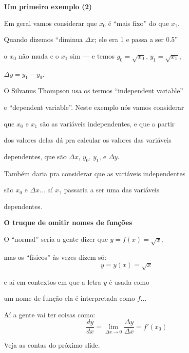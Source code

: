 \documentclass[oneside,12pt]{article}
\begin{document}
\newpage

{\bf Um primeiro exemplo (2)}

Em geral vamos considerar que $x_0$ é ``mais fixo'' do que $x_1$.

Quando dizemos ``diminua $Δx$; ele era 1 e passa a ser 0.5''

o $x_0$ não muda e o $x_1$ sim --- e temos $y_0 = \sqrt{x_0}$, $y_1 = \sqrt{x_1}$,

$Δy = y_1-y_0$.

\msk

O Silvanus Thompson usa os termos ``independent variable''

e ``dependent variable''. Neste exemplo nós vamos considerar

que $x_0$ e $x_1$ são as variáveis independentes, e que a partir

dos valores delas dá pra calcular os valores das variáveis

dependentes, que são $Δx$, $y_0$, $y_1$, e $Δy$.


\msk

Também daria pra considerar que as variáveis independentes

são $x_0$ e $Δx$... aí $x_1$ passaria a ser uma das variáveis

dependentes.


\newpage


{\bf O truque de omitir nomes de funções}

\ssk

O ``normal'' seria a gente dizer que $y = f(x) = \sqrt{x}$,

mas os ``físicos'' às vezes dizem só:
%
$$y = y(x) = \sqrt{x}$$

e aí em contextos em que a letra $y$ é usada como

um nome de função ela é interpretada como $f$...

Aí a gente vai ter coisas como:
%
\def\limdx{\lim_{Δx→0}}
%
$$\frac{dy}{dx} = \limdx \frac{Δy}{Δx} = f'(x_0)$$

Veja as contas do próximo slide.

\newpage

\end{document}
